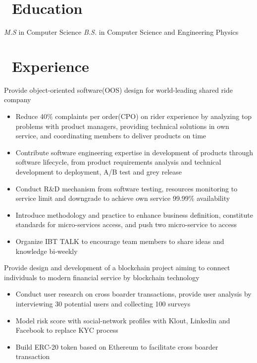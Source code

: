 \documentclass{resume}
\begin{document}



\section{\faGraduationCap\ Education}
\textit{M.S} in Computer Science
\textit{B.S.} in Computer Science and Engineering Physics

\section{\faUsers\ Experience}
Provide object-oriented software(OOS) design for world-leading shared ride company
\begin{itemize}
  \item Reduce 40\% complaints per order(CPO) on rider experience by analyzing top problems with product managers, providing technical solutions in own service, and coordinating members to deliver products on time
  \item Contribute software engineering expertise in development of products through software lifecycle, from product requirements analysis and technical development to deployment, A/B test and grey release
  \item Conduct R\&D mechanism from software testing, resources monitoring to service limit and downgrade to achieve own service 99.99\% availability
  \item Introduce methodology and practice to enhance business definition, constitute standards for micro-services access, and push two micro-service to access
  \item Organize IBT TALK to encourage team members to share ideas and knowledge bi-weekly
\end{itemize}

Provide design and development of a blockchain project aiming to connect individuals to modern financial service by blockchain technology
\begin{itemize}
  \item Conduct user research on cross boarder transactions, provide user analysis by interviewing 30 potential users and collecting 100 surveys
  \item Model risk score with social-network profiles with Klout, Linkedin and Facebook to replace KYC process
  \item Build ERC-20 token based on Ethereum to facilitate cross boarder transaction
\end{itemize}
\end{document}
